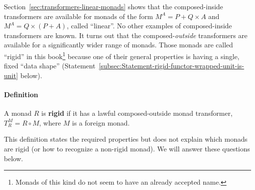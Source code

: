 Section~\ref{sec:transformers-linear-monads} shows that the composed-inside
transformers are available for monads of the
form $M^{A}=P+Q\times A$ and $M^{A}=Q\times\left(P+A\right)$, called
\textsf{``}linear\textsf{''}. No other examples of composed-inside transformers are
known. It turns out that the composed-\emph{outside} transformers
are available for a significantly wider range of monads. Those monads
are called \textsf{``}rigid\textsf{''} in this book\footnote{Monads of this kind do not seem to have an already accepted name.}
because one of their general properties is having a single, fixed
\textsf{``}data shape\textsf{''} (Statement~\ref{subsec:Statement-rigid-functor-wrapped-unit-is-unit}
below). 

\paragraph{Definition}

A monad $R$ is \textbf{rigid} if it has a lawful composed-outside
monad transformer, $T_{R}^{M}=R\circ M$, where $M$ is a foreign
monad. 

This definition states the required properties but does not explain
which monads are rigid (or how to recognize a non-rigid monad). We
will answer these questions below.

